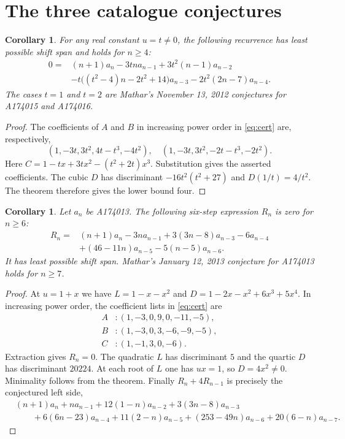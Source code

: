 \documentclass[11pt]{article}
\newtheorem{corollary}[theorem]{Corollary}
\begin{document}
\section{The three catalogue conjectures}
\begin{corollary}
For any real constant $u=t\ne0$, the following recurrence has least possible shift span and holds for $n\geq4$:
\begin{align*}
0={}&(n+1)a_n-3tn a_{n-1}+3t^2(n-1)a_{n-2}\\
 &-t\bigl((t^2-4)n-2t^2+14\bigr)a_{n-3}
     -2t^2(2n-7)a_{n-4}.
\end{align*}
The cases $t=1$ and $t=2$ are Mathar's November 13, 2012 conjectures for A174015 and A174016.
\end{corollary}
\begin{proof}
The coefficients of $A$ and $B$ in increasing power order in \eqref{eq:cert} are, respectively,
\[
 (1,-3t,3t^2,4t-t^3,-4t^2),\quad (1,-3t,3t^2,-2t-t^3,-2t^2).
\]
Here $C=1-tx+3tx^2-(t^2+2t)x^3$. Substitution gives the asserted coefficients. The cubic $D$ has discriminant $-16t^2(t^2+27)$ and $D(1/t)=4/t^2$. The theorem therefore gives the lower bound four.
\end{proof}

\begin{corollary}
Let $a_n$ be A174013. The following six-step expression $R_n$ is zero for $n\geq6$:
\begin{align*}
R_n={}&(n+1)a_n-3n a_{n-1}+3(3n-8)a_{n-3}-6a_{n-4}\\
 &+(46-11n)a_{n-5}-5(n-5)a_{n-6}.
\end{align*}
It has least possible shift span. Mathar's January 12, 2013 conjecture for A174013 holds for $n\geq7$.
\end{corollary}
\begin{proof}
At $u=1+x$ we have $L=1-x-x^2$ and $D=1-2x-x^2+6x^3+5x^4$. In increasing power order, the coefficient lists in \eqref{eq:cert} are
\[
\begin{split}
 A&:(1,-3,0,9,0,-11,-5),\\
 B&:(1,-3,0,3,-6,-9,-5),\\
 C&:(1,-1,3,0,-6).
\end{split}
\]
Extraction gives $R_n=0$. The quadratic $L$ has discriminant $5$ and the quartic $D$ has discriminant $20224$. At each root of $L$ one has $ux=1$, so $D=4x^2\ne0$. Minimality follows from the theorem. Finally $R_n+4R_{n-1}$ is precisely the conjectured left side,
\begin{align*}
 &(n+1)a_n+na_{n-1}+12(1-n)a_{n-2}+3(3n-8)a_{n-3}\\
 &\qquad+6(6n-23)a_{n-4}+11(2-n)a_{n-5}+(253-49n)a_{n-6}
          +20(6-n)a_{n-7}.
\end{align*}
\end{proof}
\end{document}
